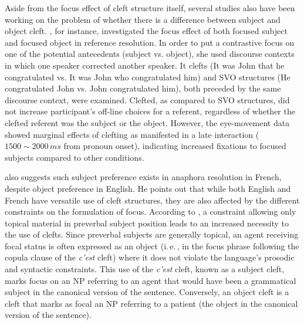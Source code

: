 Aside from the focus effect of cleft structure itself, several studies also have been working on the problem of whether there is a difference between subject and object cleft. \citet{kaiser2011}, for instance, investigated the focus effect of both focused subject and focused object in reference resolution. In order to put a contrastive focus on one of the potential antecedents (subject vs. object), she used discourse contexts in which one speaker corrected another speaker. It clefts (It was John that he congratulated vs. It was John who congratulated him) and SVO structures (He congratulated John vs. John congratulated him), both preceded by the same discourse context, were examined. Clefted, as compared to SVO structures, did not increase participant's off-line choices for a referent, regardless of whether the clefted referent was the subject or the object. However, the eye-movement data showed marginal effects of clefting as manifested in a late interaction ($1500\sim2000\,\si{ms}$ from pronoun onset), indicating increased fixations to focused subjects compared to other conditions.

\citet{reichle2014} also suggests such subject preference exists in anaphora resolution in French, despite object preference in English. He points out that while both English and French have versatile use of cleft structures, they are also affected by the different constraints on the formulation of focus. According to \citet{lambrecht2001}, a constraint allowing only topical material in preverbal subject position leads to an increased necessity to the use of clefts. Since preverbal subjects are generally topical, an agent receiving focal status is often expressed as an object (i.\,e.\,, in the focus phrase following the copula clause of the \emph{c'est} cleft) where it does not violate the language's prosodic and syntactic constraints. This use of the \emph{c'est} cleft, known as a subject cleft, marks focus on an NP referring to an agent that would have been a grammatical subject in the canonical version of the sentence. Conversely, an object cleft is a cleft that marks as focal an NP referring to a patient (the object in the canonical version of the sentence). 

